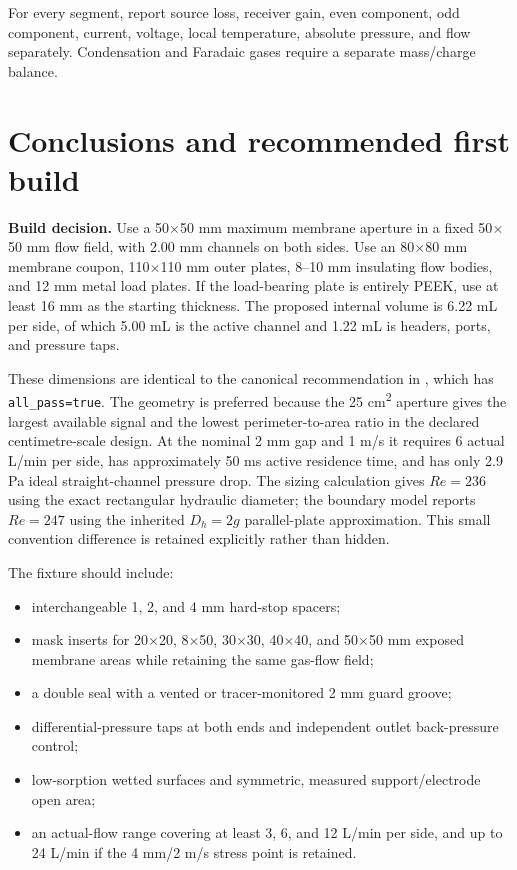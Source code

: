 \documentclass[10pt,a4paper]{article}
\begin{document}
For every segment, report source loss, receiver gain, even component, odd
component, current, voltage, local temperature, absolute pressure, and flow
separately. Condensation and Faradaic gases require a separate mass/charge
balance.

\clearpage
\section{Conclusions and recommended first build}

\begin{mainbox}
\textbf{Build decision.} Use a 50$\times$50 mm maximum membrane aperture in a
fixed 50$\times$50 mm flow field, with 2.00 mm channels on both sides. Use an
80$\times$80 mm membrane coupon, 110$\times$110 mm outer plates, 8--10 mm
insulating flow bodies, and 12 mm metal load plates. If the load-bearing plate
is entirely PEEK, use at least 16 mm as the starting thickness. The proposed
internal volume is 6.22 mL per side, of which 5.00 mL is the active channel and
1.22 mL is headers, ports, and pressure taps.
\end{mainbox}

These dimensions are identical to the canonical recommendation in
, which has
\texttt{all\_pass=true}. The geometry is preferred because the
25 cm\textsuperscript{2} aperture gives
the largest available signal and the lowest perimeter-to-area ratio in the
declared centimetre-scale design. At the nominal 2 mm gap and 1 m/s it requires
6 actual L/min per side, has approximately 50 ms active residence time, and has
only 2.9 Pa ideal straight-channel pressure drop. The sizing calculation gives
$Re=236$ using the exact rectangular hydraulic diameter; the boundary model
reports $Re=247$ using the inherited $D_h=2g$ parallel-plate approximation.
This small convention difference is retained explicitly rather than hidden.

The fixture should include:

\begin{itemize}
  \item interchangeable 1, 2, and 4 mm hard-stop spacers;
  \item mask inserts for 20$\times$20, 8$\times$50, 30$\times$30,
  40$\times$40, and 50$\times$50 mm exposed membrane areas while retaining
  the same gas-flow field;
  \item a double seal with a vented or tracer-monitored 2 mm guard groove;
  \item differential-pressure taps at both ends and independent outlet
  back-pressure control;
  \item low-sorption wetted surfaces and symmetric, measured support/electrode
  open area;
  \item an actual-flow range covering at least 3, 6, and 12 L/min per side,
  and up to 24 L/min if the 4 mm/2 m/s stress point is retained.
\end{itemize}
\end{document}
